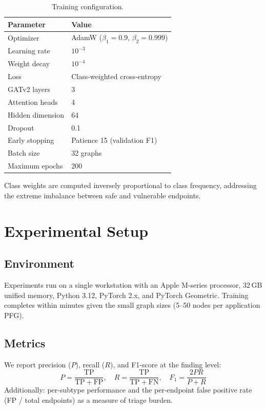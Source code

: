 \begin{table}[htbp]
\centering
\caption{Training configuration.}
\label{tab:det-hyperparams}
\small
\begin{tabular}{@{}ll@{}}
\toprule
\textbf{Parameter} & \textbf{Value} \\
\midrule
Optimizer & AdamW ($\beta_1=0.9$, $\beta_2=0.999$) \\
Learning rate & $10^{-3}$ \\
Weight decay & $10^{-4}$ \\
Loss & Class-weighted cross-entropy \\
GATv2 layers & 3 \\
Attention heads & 4 \\
Hidden dimension & 64 \\
Dropout & 0.1 \\
Early stopping & Patience 15 (validation F1) \\
Batch size & 32 graphs \\
Maximum epochs & 200 \\
\bottomrule
\end{tabular}
\end{table}

Class weights are computed inversely proportional to class frequency,
addressing the extreme imbalance between safe and vulnerable endpoints.


\section{Experimental Setup}
\label{det:setup}

\subsection{Environment}

Experiments run on a single workstation with an Apple M-series processor,
32\,GB unified memory, Python 3.12, PyTorch 2.x, and PyTorch Geometric.
Training completes within minutes given the small graph sizes (5--50 nodes
per application PFG).

\subsection{Metrics}

We report precision ($P$), recall ($R$), and F1-score at the finding level:
\begin{equation}
P = \frac{\mathrm{TP}}{\mathrm{TP} + \mathrm{FP}}, \quad
R = \frac{\mathrm{TP}}{\mathrm{TP} + \mathrm{FN}}, \quad
F_1 = \frac{2PR}{P + R}
\end{equation}
Additionally: per-subtype performance and the per-endpoint false positive
rate (FP / total endpoints) as a measure of triage burden.

